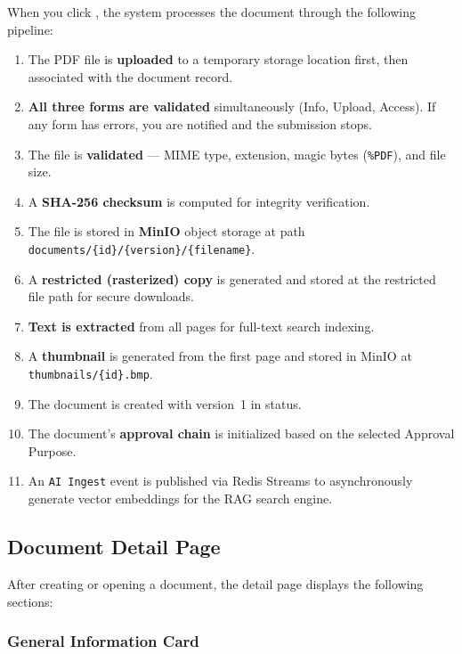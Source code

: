 When you click , the system processes the
document through the following pipeline:

\begin{enumerate}[leftmargin=18pt]
  \item The PDF file is \textbf{uploaded} to a temporary
        storage location first, then associated with the
        document record.
  \item \textbf{All three forms are validated} simultaneously
        (Info, Upload, Access). If any form has errors, you
        are notified and the submission stops.
  \item The file is \textbf{validated} --- MIME type, extension,
        magic bytes (\texttt{\%PDF}), and file size.
  \item A \textbf{SHA-256 checksum} is computed for integrity
        verification.
  \item The file is stored in \textbf{MinIO} object storage at
        path \texttt{documents/\{id\}/\{version\}/\{filename\}}.
  \item A \textbf{restricted (rasterized) copy} is generated
        and stored at the restricted file path for secure
        downloads.
  \item \textbf{Text is extracted} from all pages for full-text
        search indexing.
  \item A \textbf{thumbnail} is generated from the first page
        and stored in MinIO at
        \texttt{thumbnails/\{id\}.bmp}.
  \item The document is created with version~1 in
         status.
  \item The document's \textbf{approval chain} is initialized
        based on the selected Approval Purpose.
  \item An \texttt{AI Ingest} event is published via Redis
        Streams to asynchronously generate vector embeddings
        for the RAG search engine.
\end{enumerate}

\subsection{Document Detail Page}

After creating or opening a document, the detail page displays
the following sections:

\subsubsection*{General Information Card}

